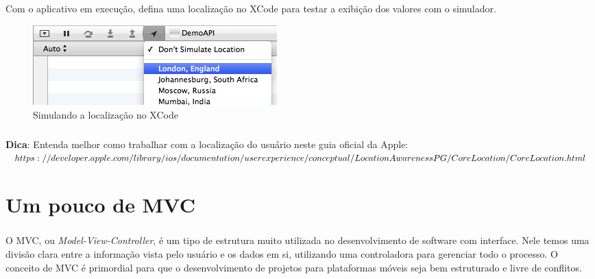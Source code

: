 \documentclass[a4paper,12pt,brazil,doubleside]{book}
\begin{document}
\begin{singlespace}
\paragraph{}Com o aplicativo em execução, defina uma localização no XCode para testar a exibição dos valores com o simulador.

\bigskip
\bigskip

\begin{figure}[H]
  \centering
  \includegraphics[totalheight=0.15\textheight]{figuras/location.png}
  \caption{Simulando a localização no XCode}
  \label{fig:a}
\end{figure}

\bigskip

\begin{framed}
\paragraph{}\textbf{Dica}: Entenda melhor como trabalhar com a localização do usuário neste guia oficial da Apple:\\
\(https://developer.apple.com/library/ios/documentation/userexperience/conceptual/\\LocationAwarenessPG/CoreLocation/CoreLocation.html\)
\end{framed}

\chapter{Um pouco de MVC}

\paragraph{}O MVC, ou \emph{Model-View-Controller}, é um tipo de estrutura muito utilizada no desenvolvimento de software com interface. Nele temos uma divisão clara entre a informação vista pelo usuário e os dados em si, utilizando uma controladora para gerenciar todo o processo. O conceito de MVC é primordial para que o desenvolvimento de projetos para plataformas móveis seja bem estruturado e livre de conflitos.

\end{singlespace}
\end{document}
